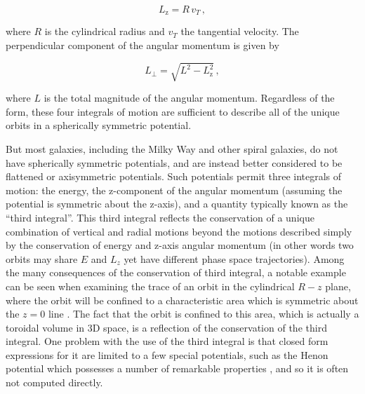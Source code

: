 \begin{equation}
    \label{ch1:eq:z-angular-momentum}
    L_\mathrm{z} = R \, v_{T}\,,
\end{equation}

\noindent where $R$ is the cylindrical radius and $v_{T}$ the tangential velocity. The perpendicular component of the angular momentum is given by

\begin{equation}
    \label{ch1:eq:perpendicular-angular-momentum}
    L_{\perp} = \sqrt{ L^{2} - L_{\mathrm{z}}^{2} }\,,
\end{equation}

\noindent where $L$ is the total magnitude of the angular momentum. Regardless of the form, these four integrals of motion are sufficient to describe all of the unique orbits in a spherically symmetric potential.

But most galaxies, including the Milky Way and other spiral galaxies, do not have spherically symmetric potentials, and are instead better considered to be flattened or axisymmetric potentials. Such potentials permit three integrals of motion: the energy, the z-component of the angular momentum (assuming the potential is symmetric about the z-axis), and a quantity typically known as the ``third integral''. This third integral reflects the conservation of a unique combination of vertical and radial motions beyond the motions described simply by the conservation of energy and z-axis angular momentum (in other words two orbits may share $E$ and $L_{z}$ yet have different phase space trajectories). Among the many consequences of the conservation of third integral, a notable example can be seen when examining the trace of an orbit in the cylindrical $R-z$ plane, where the orbit will be confined to a characteristic area which is symmetric about the $z=0$ line \parencite[see figure 3.4 in][]{binney08}. The fact that the orbit is confined to this area, which is actually a toroidal volume in 3D space, is a reflection of the conservation of the third integral. One problem with the use of the third integral is that closed form expressions for it are limited to a few special potentials, such as the Henon potential which possesses a number of remarkable properties \parencite{henon59a,binney14e}, and so it is often not computed directly.

